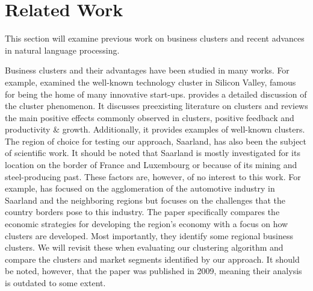 \documentclass[12pt]{article}
\begin{document}
   \section{Related Work}
   This section will examine previous work on business clusters and recent advances in natural language processing.
   
   Business clusters and their advantages have been studied in many works. For example, \cite{regionaladv} examined the well-known technology cluster in Silicon Valley, famous for being the home of many innovative start-ups. 
   \cite{clustertheory} provides a detailed discussion of the cluster phenomenon. It discusses preexisting literature on clusters and reviews the main positive effects commonly observed in clusters, positive feedback and productivity \& growth. Additionally, it provides examples of well-known clusters.
   The region of choice for testing our approach, Saarland, has also been the subject of scientific work. It should be noted that Saarland is mostly investigated for its location on the border of France and Luxembourg or because of its mining and steel-producing past.
   These factors are, however, of no interest to this work. For example, \cite{saarlandeco1} has focused on the agglomeration of the automotive industry in Saarland and the neighboring regions but focuses on the challenges that the country borders pose to this industry.
   The paper \cite{saarlandeco2} specifically compares the economic strategies for developing the region's economy with a focus on how clusters are developed. Most importantly, they identify some regional business clusters. We will revisit these when evaluating our clustering algorithm and compare the clusters and market segments identified by our approach. It should be noted, however, that the paper was published in 2009, meaning their analysis is outdated to some extent.
   
\end{document}
